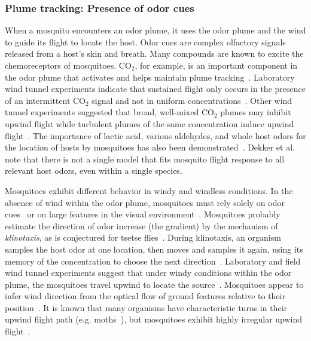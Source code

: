 \documentclass[10pt]{article}
\begin{document}
\subsubsection*{Plume tracking: Presence of odor cues}
When a mosquito encounters an odor plume, it uses the odor plume and the wind to guide its flight to locate the host.
Odor cues are complex olfactory signals released from a host's skin and breath. Many compounds are known to excite the chemoreceptors of mosquitoes.
$\mbox{CO}_2$, for example, is an important component in the odor plume that activates and helps maintain plume tracking~\cite{Bowen1991,Gibson1999,Gillies1980}. 
Laboratory wind tunnel experiments indicate that
sustained flight only occurs in the presence of an intermittent $\mbox{CO}_2$ signal and not in uniform
concentrations~\cite{Gillies1980}.  Other wind tunnel experiments suggested that broad,
well-mixed $\mbox{CO}_2$ plumes may inhibit upwind flight while turbulent plumes of the same concentration induce
upwind flight~\cite{Dekker2001,Dekker2005,Dekker2011}.
 The importance of lactic acid, various
aldehydes, and whole host odors for the location of hosts by mosquitoes has also been demonstrated~\cite{Bowen1991,Syed2009,Dekker2005,Dekker2011}. Dekker et al.~\cite{Dekker2011} note that there is not a single model that fits mosquito flight response to all relevant host odors, even within a single species.

 

Mosquitoes exhibit different behavior in windy and windless conditions. In the absence of wind within the odor plume, mosquitoes must rely solely on odor cues~\cite{Vickers2000} or on large features in the visual environment~\cite{Bidlingmayer1994}. Mosquitoes probably estimate the direction of odor increase (the gradient) by the mechanism of \textit{klinotaxis}, as is conjectured for tsetse flies~\cite{Carde1996}. During klinotaxis, an organism samples the host odor at one location, then moves and samples it again, using its memory of the concentration to choose the next direction~\cite{Vickers2000}.
%
Laboratory and field wind tunnel experiments suggest that under windy conditions within the odor plume, the mosquitoes travel upwind to locate the source~\cite{Cooperband2006, Dekker2005,Dekker2001}. Mosquitoes appear to infer wind direction from the optical flow of ground features relative to their position~\cite{Carde1996}.
It is known that many organisms have characteristic turns in their upwind flight path (e.g. moths~\cite{Carde1996,Vickers2000}), but mosquitoes exhibit highly irregular upwind flight~\cite{Davis1996}.
\end{document}
